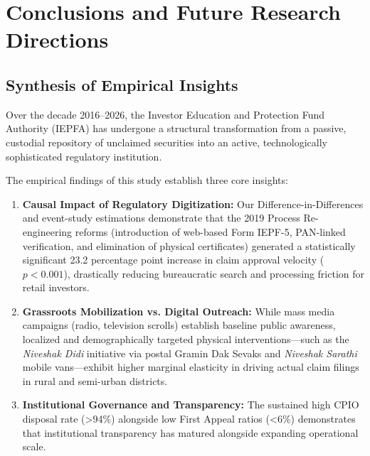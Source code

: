 \documentclass[openany]{book}
\begin{document}
\chapter{Conclusions and Future Research Directions}

\section{Synthesis of Empirical Insights}
Over the decade 2016–2026, the Investor Education and Protection Fund Authority (IEPFA) has undergone a structural transformation from a passive, custodial repository of unclaimed securities into an active, technologically sophisticated regulatory institution. 

The empirical findings of this study establish three core insights:
\begin{enumerate}
    \item \textbf{Causal Impact of Regulatory Digitization:} Our Difference-in-Differences and event-study estimations demonstrate that the 2019 Process Re-engineering reforms (introduction of web-based Form IEPF-5, PAN-linked verification, and elimination of physical certificates) generated a statistically significant 23.2 percentage point increase in claim approval velocity ($p < 0.001$), drastically reducing bureaucratic search and processing friction for retail investors.
    \item \textbf{Grassroots Mobilization vs. Digital Outreach:} While mass media campaigns (radio, television scrolls) establish baseline public awareness, localized and demographically targeted physical interventions—such as the \textit{Niveshak Didi} initiative via postal Gramin Dak Sevaks and \textit{Niveshak Sarathi} mobile vans—exhibit higher marginal elasticity in driving actual claim filings in rural and semi-urban districts.
    \item \textbf{Institutional Governance and Transparency:} The sustained high CPIO disposal rate (>94\%) alongside low First Appeal ratios (<6\%) demonstrates that institutional transparency has matured alongside expanding operational scale.
\end{enumerate}
\end{document}
